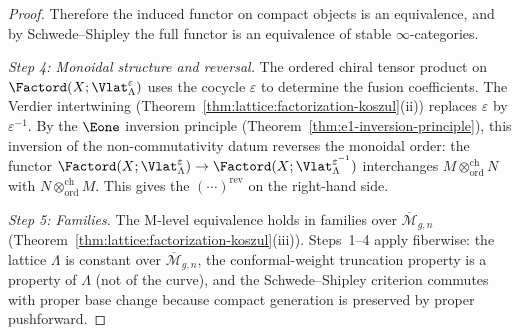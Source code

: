 \begin{proof}
Therefore the induced functor on compact objects is an
equivalence, and by Schwede--Shipley the full functor is an
equivalence of stable $\infty$-categories.

\emph{Step 4: Monoidal structure and reversal.}
The ordered chiral tensor product on
$\Factord(X; \Vlat_\Lambda^\varepsilon)$ uses the cocycle
$\varepsilon$ to determine the fusion coefficients. The Verdier
intertwining
(Theorem~\ref{thm:lattice:factorization-koszul}(ii)) replaces
$\varepsilon$ by $\varepsilon^{-1}$. By the $\Eone$ inversion
principle (Theorem~\ref{thm:e1-inversion-principle}), this
inversion of the non-commutativity datum reverses the monoidal
order: the functor
$\Factord(X; \Vlat_\Lambda^\varepsilon) \to
\Factord(X; \Vlat_\Lambda^{\varepsilon^{-1}})$ interchanges
$M \otimes^{\mathrm{ch}}_{\mathrm{ord}} N$ with
$N \otimes^{\mathrm{ch}}_{\mathrm{ord}} M$. This gives the
$(\cdots)^{\mathrm{rev}}$ on the right-hand side.

\emph{Step 5: Families.}
The M-level equivalence holds in families over
$\overline{\mathcal{M}}_{g,n}$
(Theorem~\ref{thm:lattice:factorization-koszul}(iii)).
Steps~1--4 apply fiberwise: the lattice $\Lambda$ is constant over
$\overline{\mathcal{M}}_{g,n}$, the conformal-weight truncation
property is a property of $\Lambda$ (not of the curve), and the
Schwede--Shipley criterion commutes with proper base change because
compact generation is preserved by proper pushforward.
\end{proof}


